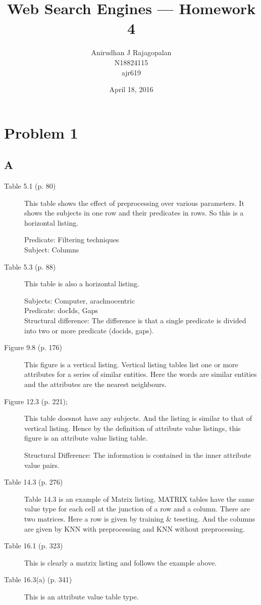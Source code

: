 \documentclass{article}
\begin{document}
\title{Web Search Engines --- Homework 4}
\date{April 18, 2016}
\author{Anirudhan J Rajagopalan\\ N18824115\\ ajr619}
\maketitle

\newpage

\section{Problem 1}
\subsection{A}

\begin{description}
  \item[Table 5.1 (p. 80)]
    This table shows the effect of preprocessing over various parameters.  It shows the subjects in one row and their predicates in rows.  So this is a horizontal listing.

    Predicate: Filtering techniques\\
    Subject:  Columns
  \item[Table 5.3 (p. 88)]
    This table is also a horizontal listing.

    Subjects: Computer, arachnocentric \\
    Predicate: docIds, Gaps \\
    Structural difference:  The difference is that a single predicate is divided into two or more predicate (docids, gaps).
  \item[Figure 9.8 (p. 176)]
    This figure is a vertical listing.  Vertical listing tables  list  one  or  more  attributes  for  a  series  of  similar entities.  Here the words are similar entities and the attributes are the nearest neighbours.

  \item[Figure 12.3 (p. 221);]
    This table doesnot have any subjects.  And the listing is similar to that of vertical listing.  Hence by the definition of attribute value listings, this figure is an attribute value listing table.
    
    Structural Difference: The information is contained in the inner attribute value pairs.
  \item[Table 14.3 (p. 276)]
    Table 14.3 is an example of Matrix listing.  MATRIX tables  have  the  same  value  type  for  each  cell  at  the  junction of a row and a column.   There are two matrices.  Here a row is given by training \& teseting.  And the columns are given by KNN with preprocessing and KNN without preprocessing.
  \item[Table 16.1 (p. 323)]
    This is clearly a matrix listing and follows the example above. 
  \item[Table 16.3(a) (p. 341)]
    This is an attribute value table type.


\end{description}
\end{document}
